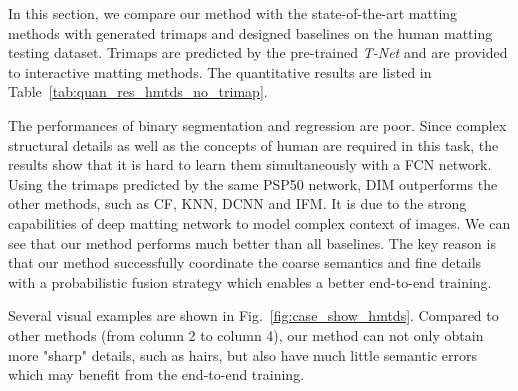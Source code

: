 In this section, we compare our method with the state-of-the-art matting methods with generated trimaps and designed baselines on the human matting testing dataset.
Trimaps are predicted by the pre-trained \emph{T-Net} and are provided to interactive matting methods.
The quantitative results are listed in Table~\ref{tab:quan_res_hmtds_no_trimap}.

The performances of binary segmentation and regression are poor.
Since complex structural details as well as the concepts of human are required in this task, the results show that it is hard to learn them simultaneously with a FCN network.
Using the trimaps predicted by the same PSP50 network, DIM outperforms the other methods, such as CF, KNN, DCNN and IFM. It is due to the strong capabilities of deep matting network to model complex context of images.
We can see that our method performs much better than all baselines.
The key reason is that our method successfully coordinate the coarse semantics and fine details with a probabilistic fusion strategy which enables a better end-to-end training.


Several visual examples are shown in Fig.~\ref{fig:case_show_hmtds}.
Compared to other methods (from column 2 to column 4), our method can not only obtain more "sharp" details, such as hairs, but also have much little semantic errors which may benefit from the end-to-end training.



